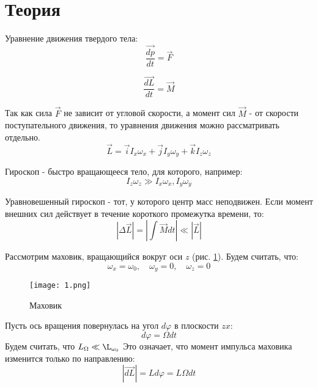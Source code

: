 \section{Теория}
Уравнение движения твердого тела:
    \begin{equation}
        \frac{\overrightarrow{dp}}{dt}=\overrightarrow{F}
    \end{equation}
    
    \begin{equation}
        \frac{\overrightarrow{dL}}{dt}=\overrightarrow{M}
    \end{equation}
    
    Так как сила $\overrightarrow{F}$ не зависит от угловой скорости, а момент сил $\overrightarrow{M}$ - от скорости поступательного движения, то уравнения движения можно рассматривать отдельно.
    \begin{equation}
        \overrightarrow{L}=\overrightarrow{i}I_x\omega_x+\overrightarrow{j}I_y\omega_y+\overrightarrow{k}I_z\omega_z
    \end{equation}
    
    Гироскоп  - быстро вращающееся тело, для которого, например:
    \begin{equation}
        I_z\omega_z\gg I_x\omega_x, I_y\omega_y
    \end{equation}
    
    Уравновешенный гироскоп - тот, у которого центр масс неподвижен.
    Если момент внешних сил действует в течение короткого промежутка времени, то:
    \begin{equation}
        \left|\Delta \overrightarrow{L}\right|=\left|\int \overrightarrow{M}dt\right|\ll \left|\overrightarrow{L}\right|
    \end{equation}
    
    Рассмотрим маховик, вращающийся вокруг оси $z$ (рис. \ref{маховик}). Будем считать, что:
    \begin{equation}
        \omega_x=\omega_0,\quad		\omega_y=0, \quad	\omega_z=0
    \end{equation}
    
    \begin{figure}[h!]
        \begin{center}
        \texttt{[image: 1.png]}
        \end{center}
        \caption{Маховик} \label{маховик}
    \end{figure}
    
    Пусть ось вращения повернулась на угол $d\varphi$ в плоскости $zx$:
    \[d\varphi=\Omega dt\]
    Будем считать, что $L_\Omega \ll \L_{\omega_0}$ 
    Это означает, что момент импульса маховика изменится только по направлению:
    \begin{equation}
        \left|\overrightarrow{dL}\right|=Ld\varphi=L\Omega dt
    \end{equation} 
    
